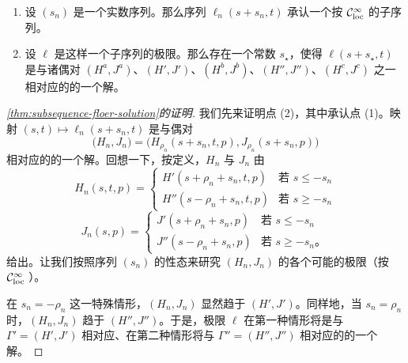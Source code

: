 \begin{proposition}\label{thm:subsequence-floer-solution}
\begin{enumerate}[label=(\arabic*)]
\item 设 $(s_{n})$ 是一个实数序列。那么序列 $\ell_{n}(s+s_{n},t)$ 承认一个按 $\mathcal{C}^{\infty}_{\mathrm{loc}}$ \trTopology{}\trConvergence{}的子序列。
\item 设 $\ell$ 是这样一个子序列的极限。那么存在一个常数 $s_{\star}$，使得 $\ell(s+s_{\star},t)$ 是与诸偶对 $(H^{a},J^{a})$、$(H',J')$、$(H^{b},J^{b})$、$(H'',J'')$、$(H^{c},J^{c})$ 之一相对应的\trFloerEquation{}的一个解。
\end{enumerate}
\end{proposition}

\begin{proof}[\cref{thm:subsequence-floer-solution}的证明]
我们先来证明点 (2)，其中承认点 (1)。映射 $(s,t)\longmapsto\ell_{n}(s+s_{n},t)$ 是与偶对
\[
\bigl(H_{n},J_{n}\bigr)=\bigl(H_{\rho_{n}}(s+s_{n},t,p),J_{\rho_{n}}(s+s_{n},p)\bigr)
\]
相对应的\trFloerEquation{}的一个解。回想一下，按定义，$H_{n}$ 与 $J_{n}$ 由
\[
H_{n}(s,t,p)=
\left\{\begin{array}{ll}
H'(s+\rho_{n}+s_{n},t,p) & \text{若 } s\le-s_{n}\\
H''(s-\rho_{n}+s_{n},t,p) & \text{若 } s\ge-s_{n}
\end{array}\right.
\]
\[
J_{n}(s,p)=
\left\{\begin{array}{ll}
J'(s+\rho_{n}+s_{n},p) & \text{若 } s\le-s_{n}\\
J''(s-\rho_{n}+s_{n},p) & \text{若 } s\ge-s_{n}\text{。}
\end{array}\right.
\]
给出。让我们按照序列 $(s_{n})$ 的性态来研究 $(H_{n},J_{n})$ 的各个可能的极限（按 $\mathcal{C}^{\infty}_{\mathrm{loc}}$ \trTopology）。

在 $s_{n}=-\rho_{n}$ 这一特殊情形，$(H_{n},J_{n})$ 显然趋于 $(H',J')$。同样地，当 $s_{n}=\rho_{n}$ 时，$(H_{n},J_{n})$ 趋于 $(H'',J'')$。于是，极限 $\ell$ 在第一种情形将是与 $\Gamma'=(H',J')$ 相对应、在第二种情形将与 $\Gamma''=(H'',J'')$ 相对应的\trFloerEquation{}的一个解。


\end{proof}

